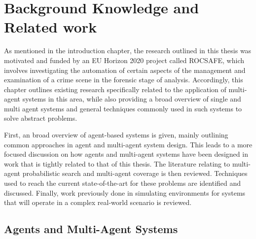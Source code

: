 

\chapter{Background Knowledge and Related work}

\workinprogress
\newline

As mentioned in the introduction chapter, the research outlined in this thesis was motivated and funded by an EU Horizon 2020 project called ROCSAFE, which involves investigating the automation of certain aspects of the management and examination of a crime scene in the forensic stage of analysis. Accordingly, this chapter outlines existing research specifically related to the application of multi-agent systems in this area, while also providing a broad overview of single and multi agent systems and general techniques commonly used in such systems to solve abstract problems. \par
First, an broad overview of agent-based systems is given, mainly outlining common approaches in agent and multi-agent system design. This leads to a more focused discussion on how agents and multi-agent systems have been designed in work that is tightly related to that of this thesis. The literature relating to multi-agent probabilistic search and multi-agent coverage is then reviewed. Techniques used to reach the current state-of-the-art for these problems are identified and discussed. Finally, work previously done in simulating environments for systems that will operate in a complex real-world scenario is reviewed.

\section{Agents and Multi-Agent Systems}


